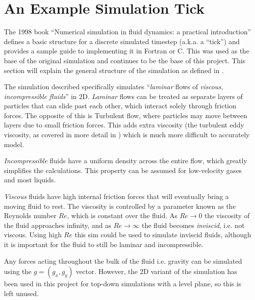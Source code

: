 \newcommand{\deltaT}[0]{$\delta{}t$}
\newcommand{\deltaX}[0]{$\delta{}x$}
\newcommand{\deltaY}[0]{$\delta{}y$}

\section{An Example Simulation Tick}\label{sec:Research:SimulationTick}
The 1998 book ``Numerical simulation in fluid dynamics: a practical introduction''\cite{book:griebel1998numerical} defines a basic structure for a discrete simulated timestep (a.k.a. a ``tick'') and provides a sample guide to implementing it in Fortran or C.
This was used as the base of the original simulation and continues to be the base of this project.
This section will explain the general structure of the simulation as defined in \cite{book:griebel1998numerical}.

The simulation described specifically simulates ``\emph{laminar} flows of \emph{viscous, incompressible fluids}''\cite{book:griebel1998numerical} in 2D.
\emph{Laminar} flows can be treated as separate layers of particles that can slide past each other, which interact solely through friction forces.
The opposite of this is Turbulent flow, where particles may move between layers due to small friction forces\cite{book:griebel1998numerical}.
This adds extra viscosity (the turbulent eddy viscosity, as covered in more detail in \cite{bird2006transport}) which is much more difficult to accurately model.

\emph{Incompressible} fluids have a uniform density across the entire flow, which greatly simplifies the calculations.
This property can be assumed for low-velocity gases and most liquids\cite{book:griebel1998numerical}.

\emph{Viscous} fluids have high internal friction forces that will eventually bring a moving fluid to rest.
The viscosity is controlled by a parameter known as the Reynolds number $Re$\cite{falkovich2018fluid}, which is constant over the fluid.
As $Re \to 0$ the viscosity of the fluid approaches infinity, and as $Re \to \infty$ the fluid becomes \emph{inviscid}, i.e. not viscous.
Using high $Re$ this sim could be used to simulate inviscid fluids, although it is important for the fluid to still be laminar and incompressible.

Any forces acting throughout the bulk of the fluid i.e. gravity can be simulated using the $g = (g_x, g_y)$ vector.
However, the 2D variant of the simulation has been used in this project for top-down simulations with a level plane, so this is left unused.

